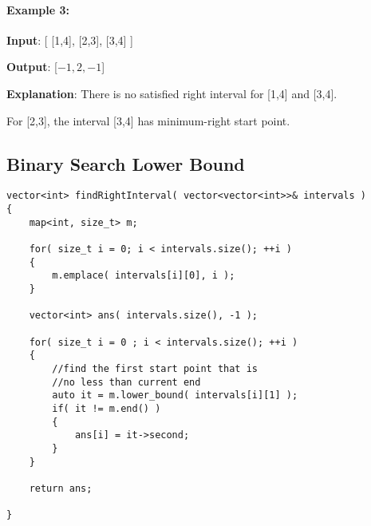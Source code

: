 \paragraph{Example 3:}

\begin{flushleft}
\textbf{Input}: [ [1,4], [2,3], [3,4] ]

\textbf{Output}: [$-1, 2, -1$]

\textbf{Explanation}: There is no satisfied right interval for [1,4] and [3,4].

For [2,3], the interval [3,4] has minimum-right start point.
\end{flushleft}

\subsection{Binary Search Lower Bound}

\setcounter{lstlisting}{0}
\begin{lstlisting}[style=customc, caption={Lower Bound}]
vector<int> findRightInterval( vector<vector<int>>& intervals )
{
    map<int, size_t> m;

    for( size_t i = 0; i < intervals.size(); ++i )
    {
        m.emplace( intervals[i][0], i );
    }

    vector<int> ans( intervals.size(), -1 );

    for( size_t i = 0 ; i < intervals.size(); ++i )
    {
        //find the first start point that is
        //no less than current end
        auto it = m.lower_bound( intervals[i][1] );
        if( it != m.end() )
        {
            ans[i] = it->second;
        }
    }

    return ans;

}
\end{lstlisting}